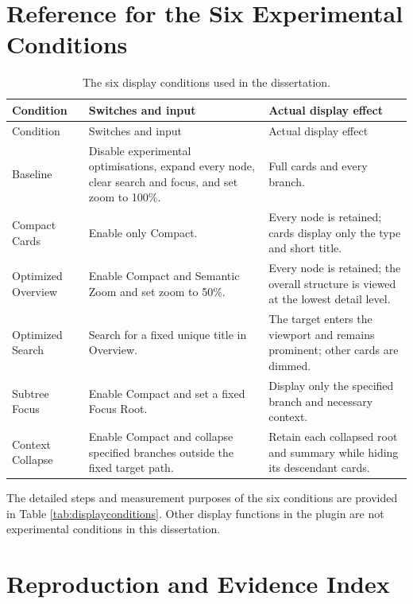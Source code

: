 \chapter{Reference for the Six Experimental Conditions}
\label{app:features}

\small
\begin{longtable}{p{}p{}p{}}
\caption{The six display conditions used in the dissertation.}\\
\toprule Condition & Switches and input & Actual display effect\\ \midrule\endfirsthead
\toprule Condition & Switches and input & Actual display effect\\ \midrule\endhead
Baseline & Disable experimental optimisations, expand every node, clear search and focus, and set zoom to 100\%. & Full cards and every branch.\\
Compact Cards & Enable only Compact. & Every node is retained; cards display only the type and short title.\\
Optimized Overview & Enable Compact and Semantic Zoom and set zoom to 50\%. & Every node is retained; the overall structure is viewed at the lowest detail level.\\
Optimized Search & Search for a fixed unique title in Overview. & The target enters the viewport and remains prominent; other cards are dimmed.\\
Subtree Focus & Enable Compact and set a fixed Focus Root. & Display only the specified branch and necessary context.\\
Context Collapse & Enable Compact and collapse specified branches outside the fixed target path. & Retain each collapsed root and summary while hiding its descendant cards.\\
\bottomrule
\end{longtable}

The detailed steps and measurement purposes of the six conditions are provided in Table \ref{tab:displayconditions}. Other display functions in the plugin are not experimental conditions in this dissertation.

\chapter{Reproduction and Evidence Index}
\label{app:evidence}

